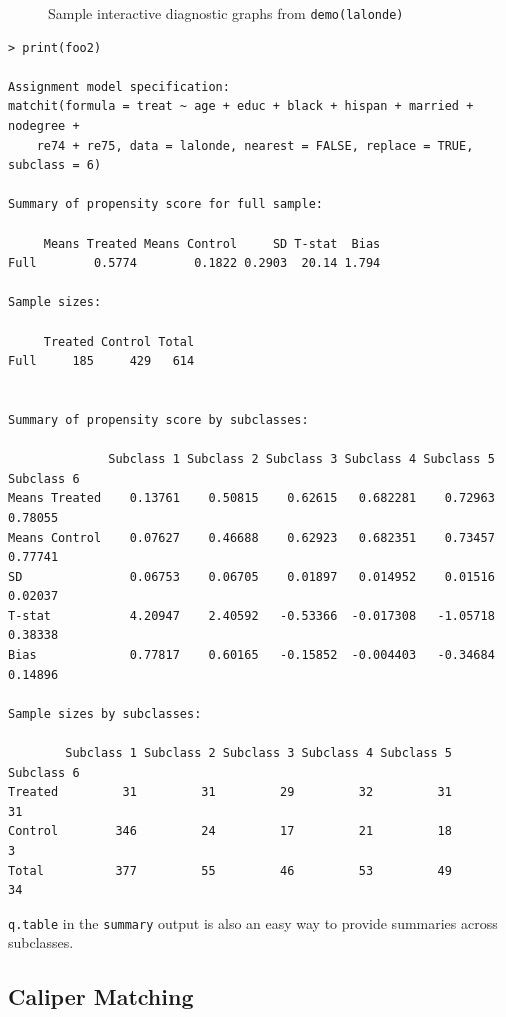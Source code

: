 \documentclass[oneside,letterpaper,titlepage]{article}
\begin{document}
\begin{figure}[tbp]
\begin{center}
    \hfill
    \caption{Sample interactive diagnostic graphs from \texttt{demo(lalonde)}}
\label{diags}
\end{center}
\end{figure}


\begin{verbatim}
> print(foo2)
 
Assignment model specification:
matchit(formula = treat ~ age + educ + black + hispan + married + nodegree + 
    re74 + re75, data = lalonde, nearest = FALSE, replace = TRUE, subclass = 6)
 
Summary of propensity score for full sample:
 
     Means Treated Means Control     SD T-stat  Bias
Full        0.5774        0.1822 0.2903  20.14 1.794
 
Sample sizes:
 
     Treated Control Total
Full     185     429   614
 
 
Summary of propensity score by subclasses:
 
              Subclass 1 Subclass 2 Subclass 3 Subclass 4 Subclass 5 Subclass 6
Means Treated    0.13761    0.50815    0.62615   0.682281    0.72963    0.78055
Means Control    0.07627    0.46688    0.62923   0.682351    0.73457    0.77741
SD               0.06753    0.06705    0.01897   0.014952    0.01516    0.02037
T-stat           4.20947    2.40592   -0.53366  -0.017308   -1.05718    0.38338
Bias             0.77817    0.60165   -0.15852  -0.004403   -0.34684    0.14896
 
Sample sizes by subclasses:
 
        Subclass 1 Subclass 2 Subclass 3 Subclass 4 Subclass 5 Subclass 6
Treated         31         31         29         32         31         31
Control        346         24         17         21         18          3
Total          377         55         46         53         49         34
\end{verbatim}

\noindent \texttt{q.table} in the {\tt summary} output is also an easy way to provide summaries across
subclasses.  

\subsection{Caliper Matching}
\end{document}
